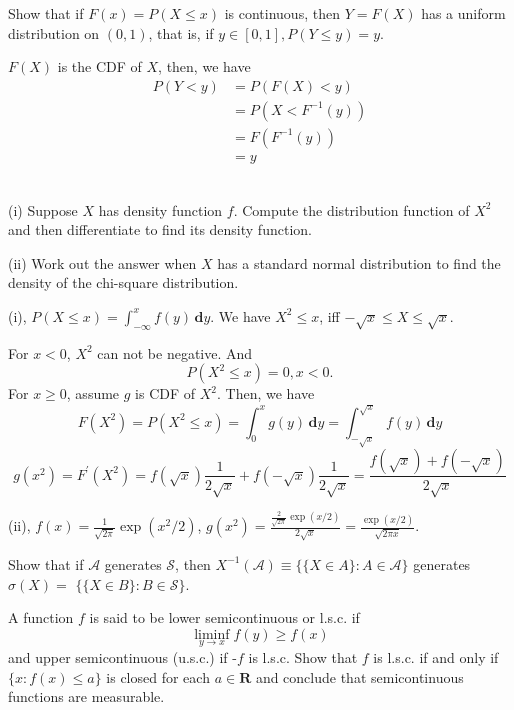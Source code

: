 \documentclass[en, normal, 11pt, black]{elegantnote}
\newenvironment{exercise}[1]{\begin{tcolorbox}[colback=black!15, colframe=black!80, breakable, title=#1]}{\end{tcolorbox}}
\renewenvironment{proof}{\begin{tcolorbox}[colback=white, colframe=black!50, breakable, title=Proof. ]\setlength{\parskip}{0.8em}}{\\\rightline{$\square$}\end{tcolorbox}}
\newenvironment{solution}{\begin{tcolorbox}[colback=white, colframe=black!50, breakable, title=Solution. ]\setlength{\parskip}{0.8em}}{\end{tcolorbox}}
\newcommand{\der}{\,\mathbf{d}}
\begin{document}
    \begin{exercise}{1.2.4}
        Show that if $F(x)=P(X \leq x)$ is continuous, then $Y=F(X)$ has a uniform distribution on $(0,1)$, that is, if $y \in[0,1], P(Y \leq y)=y$.
    \end{exercise}

    \begin{proof}
        $F(X)$ is the CDF of $X$, then, we have
        \begin{align*}
            P(Y<y)&=P(F(X)<y)\\
            &=P(X<F^{-1}(y))\\
            &=F(F^{-1}(y))\\
            &=y
        \end{align*}
    \end{proof}

    \begin{exercise}{1.2.7}
        (i) Suppose $X$ has density function $f$. Compute the distribution function of $X^{2}$ and then differentiate to find its density function. 
        
        (ii) Work out the answer when $X$ has a standard normal distribution to find the density of the chi-square distribution. 
    \end{exercise}

    \begin{solution}
        (i), $P(X\leqslant x)=\int_{-\infty}^xf(y)\der y$. We have $X^2\leqslant x$, iff $-\sqrt{x}\leqslant X \leqslant \sqrt{x}$. 
        
        For $x<0$, $X^2$ can not be negative. And
        \[P(X^2\leqslant x)=0, x<0.\]
        For $x\geqslant 0$, assume $g$ is CDF of $X^2$. Then, we have
        \[F(X^2)=P(X^2\leqslant x)=\int_0^x g(y)\der y=\int_{-\sqrt{x}}^{\sqrt{x}}f(y)\der y\]
        \[g(x^2)=F^\prime(X^2)=f(\sqrt{x})\frac{1}{2\sqrt{x}}+f(-\sqrt{x})\frac{1}{2\sqrt{x}}=\frac{f(\sqrt{x})+f(-\sqrt{x})}{2\sqrt{x}}\]

        (ii), $f(x)=\frac{1}{\sqrt{2\pi}}\exp(x^2/2)$, $g(x^2)=\frac{\frac{2}{\sqrt{2\pi}}\exp(x/2)}{2\sqrt{x}}=\frac{\exp(x/2)}{\sqrt{2\pi x}}$. 
    \end{solution}

    \begin{exercise}{1.3.1}
        Show that if $\mathcal{A}$ generates $\mathcal{S}$, then $X^{-1}(\mathcal{A}) \equiv\{\{X \in A\}: A \in \mathcal{A}\}$ generates $\sigma(X)=$ $\{\{X \in B\}: B \in \mathcal{S}\} .$
    \end{exercise}

    \begin{exercise}{1.3.5}
        A function $f$ is said to be lower semicontinuous or l.s.c. if
        $$
        \liminf _{y \rightarrow x} f(y) \geq f(x)
        $$
        and upper semicontinuous (u.s.c.) if -$f$ is l.s.c. Show that $f$ is l.s.c. if and only if $\{x: f(x) \leq a\}$ is closed for each $a \in \mathbf{R}$ and conclude that semicontinuous functions are measurable.
    \end{exercise}
    
\end{document}
